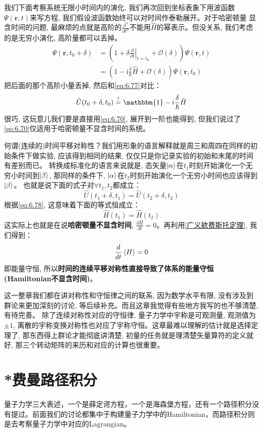 \documentclass[a4paper,zihao=-4,linespread=1]{ctexrep}
\begin{document}
    我们下面考察系统无限小时间内的演化, 我们再次回到坐标表象下用波函数$\Psi(\mathbf{r},t)$来写方程, 我们假设波函数始终可以对时间作泰勒展开。对于哈密顿量
    显含时间的问题, 最麻烦的点就是高阶的$\frac{\partial^n}{\partial t^n}$不能用$\hat{H}$的幂表示。但没关系, 我们考虑的是无穷小演化, 高阶量都可以丢掉。
    \begin{align*}
        \Psi(\mathbf{r},t_0+\delta)&=\left(1+\delta\left.\frac{\partial }{\partial t}\right|_{t=t_0}+\mathcal{O}(\delta)\right)\Psi(\mathbf{r},t)\\
        &=\left(1-\mathrm{i}\frac{\delta}{\hbar}\hat{H}+\mathcal{O}(\delta)\right)\Psi(\mathbf{r},t_0)
    \end{align*}
    把后面的那个高阶小量丢掉, 然后和\ref{eq:6.77}对比：
    \begin{equation}
        \label{eq:6.78}
        \hat{U}(t_0+\delta,t_0)\overset{!}{=}\mathbbm{1}-i\frac{\delta}{\hbar}\hat{H}
    \end{equation}
    很巧, 这玩意儿我们要是直接用\ref{eq:6.70}, 展开到一阶也能得到, 但我们说过了\ref{eq:6.70}仅适用于哈密顿量不显含时间的系统。

    何谓(连续的)时间平移对称性？我们用形象的语言解释就是周三和周四在同样的初始条件下做实验, 应该得到相同的结果, 仅仅只是你记录实验的初始和末尾的时间有差别而已。
    转换成标准化的语言来说就是, 态矢量$\ket{\alpha}$在$t_1$时刻开始演化一个无穷小时间到$\ket{\beta}$, 那同样的条件下, $\ket{\alpha}$在$t_2$时刻开始演化一个无穷小时间也应该得到$\ket{\beta}$。
    也就是说下面的式子对$\forall t_1,t_2$都成立：
    \[\hat U(t_1+\delta,t_1)=\hat{U}(t_2+\delta,t_2)\]
    根据\ref{eq:6.78}, 这意味着下面的等式恒成立：
    \[\hat{H}(t_1)=\hat{H}(t_2)\]
    这实际上也就是在说\textbf{哈密顿量不显含时间}, $\frac{\partial \hat{H}}{\partial t}=0$。再利用\ref{广义欸费斯托定理}, 我们得到：
    \[\frac{d}{dt}\braket{H}=0\]
    即能量守恒, 所以\textbf{时间的连续平移对称性直接导致了体系的能量守恒(Hamiltonian不显含时间)}。

    这一整章我们都在讲对称性和守恒律之间的联系, 因为数学水平有限, 没有涉及到群论来更加深刻的讨论, 等后续补充。而且这章我觉得有些地方我写的也不够清楚, 有待完善。
    除了连续对称性对应的守恒律, 量子力学中宇称是可观测量, 观测值为$\pm 1$, 离散的宇称变换对称性也对应了宇称守恒。这章最难以理解的估计就是选择定理了, 那东西得上群论才能彻底讲清楚,
    初量的任务就是理清楚矢量算符的定义就好, 那三个转动矩阵的来历和对应的计算也很重要。

	\section{*费曼路径积分}
	量子力学三大表述，一个是薛定谔方程，一个是海森堡方程，还有一个路径积分没有提过。前面我们的讨论都集中于构建量子力学中的Hamiltonian，而路径积分则是去考察量子力学中对应的Lagrangian。
	
\end{document}
